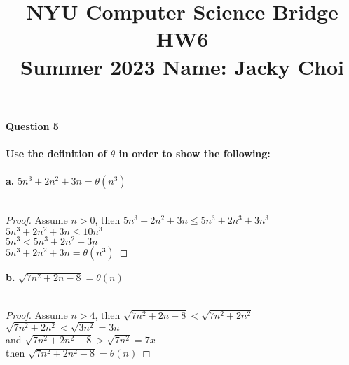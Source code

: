 \documentclass{article}
\title{\textbf{NYU Computer Science Bridge HW6}\\
Summer 2023 Name: Jacky Choi}
\date{}
\begin{document}
\setul{}{2pt}
\maketitle

\noindent \textbf{Question 5}\\\\
\textbf{Use the definition of $\theta$ in order to show the following: }\\\\
\textbf{a.}
$5n^3 + 2n^2 + 3n = \theta (n^3)$\\\\
\begin{proof}

Assume $n > 0$, then $5n^3 + 2n^2 + 3n \leq 5n^3 + 2n^3 + 3n^3$\\
$5n^3 + 2n^2 + 3n \leq 10n^3$\\
$5n^3 < 5n^3 + 2n^2 + 3n$\\
$5n^3 + 2n^2 + 3n = \theta(n^3)$
\end{proof}
\noindent \textbf{b.}
$\sqrt{7n^2 + 2n - 8} = \theta (n)$\\\\
\begin{proof}

    Assume $n > 4$, then $\sqrt{7n^2 + 2n - 8} < \sqrt{7n^2 + 2n^2}$\\
    $\sqrt{7n^2 + 2n^2} < \sqrt{3n^2} = 3n$\\
    and $\sqrt{7n^2 + 2n^2 - 8} > \sqrt{7n^2} = 7x$\\
    then $\sqrt{7n^2 + 2n^2 - 8} = \theta(n)$
    \end{proof}
\end{document}
